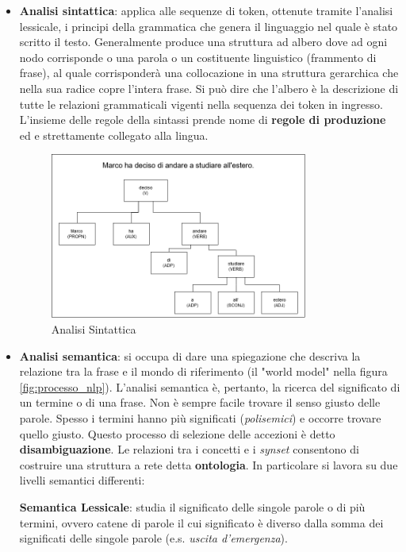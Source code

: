 \begin{itemize}
    \item \textbf{Analisi sintattica}: applica alle sequenze di token, ottenute tramite l’analisi lessicale, i principi della grammatica che genera il linguaggio nel quale è stato scritto il testo. Generalmente produce una struttura ad albero dove ad ogni nodo corrisponde o una parola o un costituente linguistico (frammento di frase), al quale corrisponderà una collocazione in una struttura gerarchica che nella sua radice copre l’intera frase. Si può dire che l’albero è la descrizione di tutte le relazioni grammaticali vigenti nella sequenza dei token in ingresso.
    L'insieme delle regole della sintassi prende nome di \textbf{regole di produzione} ed e strettamente collegato alla lingua.
    
    \begin{figure}[hbt!]
        \centering
        \includegraphics[width=0.8\textwidth]{img/analisi_sintattica.png}
        \caption{Analisi Sintattica}
        \label{fig:analisi_sintattica}
    \end{figure}
    
    \item \textbf{Analisi semantica}: si occupa di dare una spiegazione che descriva la relazione tra la frase e il mondo di riferimento (il "world model" nella figura \ref{fig:processo_nlp}).  L'analisi semantica è, pertanto, la ricerca del significato di un termine o di una frase. Non è sempre facile trovare il senso giusto delle parole. Spesso i termini hanno più significati (\textit{polisemici}) e occorre trovare quello giusto. Questo processo di selezione delle accezioni è detto \textbf{disambiguazione}. Le relazioni tra i concetti e i \textit{synset} consentono di costruire una struttura a rete detta \textbf{ontologia}. 
    In particolare si lavora su due livelli semantici differenti:
    
    \textbf{Semantica Lessicale}: studia il significato delle singole parole o di più termini, ovvero catene di parole il cui significato è diverso dalla somma dei significati delle singole parole (e.s. \textit{uscita d’emergenza}).
    

\end{itemize}
